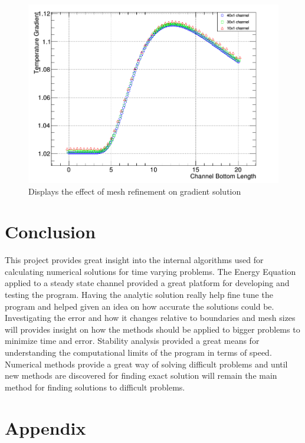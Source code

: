 \documentclass[paper=a4, fontsize=11pt, abstract=on]{scrartcl}
\numberwithin{equation}{section}		%
\numberwithin{figure}{section}			%
\numberwithin{table}{section}				%
\begin{document}
\begin{figure}[H]
\centering
\includegraphics[width=0.75\linewidth]{chan2}
\caption{Displays the effect of mesh refinement on gradient solution}
\label{chan2}
\end{figure}

\section{Conclusion}
This project provides great insight into the internal algorithms used for calculating numerical solutions for time varying problems. The Energy Equation applied to a steady state channel provided a great platform for developing and testing the program. Having the analytic solution really help fine tune the program and helped given an idea on how accurate the solutions could be. Investigating the error and how it changes relative to boundaries and mesh sizes will provides insight on how the methods should be applied to bigger problems to minimize time and error. Stability analysis provided a great means for understanding the computational limits of the program in terms of speed. Numerical methods provide a great way of solving difficult problems and until new methods are discovered for finding exact solution will remain the main method for finding solutions to difficult problems. 





\newpage
\appendix
\section{Appendix} \label{App:Appendix}
\end{document}
